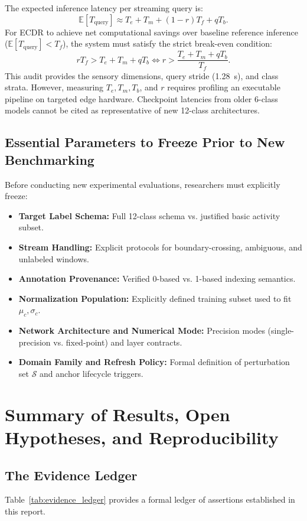 \documentclass[11pt,a4paper]{article}
\theoremstyle{definition}
\begin{document}
The expected inference latency per streaming query is:
\begin{equation}
\mathbb{E}[T_{\text{query}}] \approx T_e + T_m + (1 - r) T_f + q T_b.
\end{equation}
For ECDR to achieve net computational savings over baseline reference inference ($\mathbb{E}[T_{\text{query}}] < T_f$), the system must satisfy the strict break-even condition:
\begin{equation}
r T_f > T_e + T_m + q T_b \iff r > \frac{T_e + T_m + q T_b}{T_f}.
\end{equation}
This audit provides the sensory dimensions, query stride (1.28~s), and class strata. However, measuring $T_e, T_m, T_b$, and $r$ requires profiling an executable pipeline on targeted edge hardware. Checkpoint latencies from older 6-class models cannot be cited as representative of new 12-class architectures.

\subsection{Essential Parameters to Freeze Prior to New Benchmarking}
Before conducting new experimental evaluations, researchers must explicitly freeze:
\begin{itemize}
\item \textbf{Target Label Schema:} Full 12-class schema vs. justified basic activity subset.
\item \textbf{Stream Handling:} Explicit protocols for boundary-crossing, ambiguous, and unlabeled windows.
\item \textbf{Annotation Provenance:} Verified 0-based vs. 1-based indexing semantics.
\item \textbf{Normalization Population:} Explicitly defined training subset used to fit $\mu_c, \sigma_c$.
\item \textbf{Network Architecture and Numerical Mode:} Precision modes (single-precision vs. fixed-point) and layer contracts.
\item \textbf{Domain Family and Refresh Policy:} Formal definition of perturbation set $\mathcal{S}$ and anchor lifecycle triggers.
\end{itemize}

\section{Summary of Results, Open Hypotheses, and Reproducibility}

\subsection{The Evidence Ledger}
Table~\ref{tab:evidence_ledger} provides a formal ledger of assertions established in this report.
\end{document}
